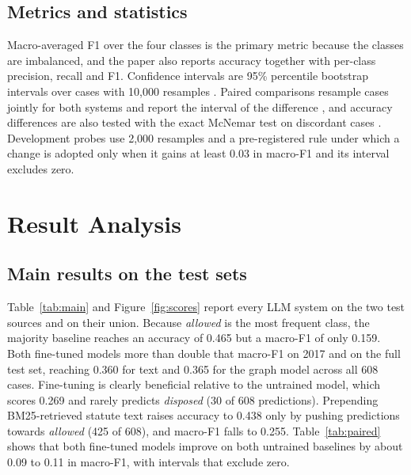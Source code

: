 \documentclass[journal]{IEEEtran}
\newcommand{\cls}[1]{\emph{#1}}
\begin{document}
\subsection{Metrics and statistics}
Macro-averaged F1 over the four classes is the primary metric because the classes are imbalanced, and the paper also reports accuracy together with per-class precision, recall and F1. Confidence intervals are 95\% percentile bootstrap intervals over cases with 10,000 resamples \cite{r34}. Paired comparisons resample cases jointly for both systems and report the interval of the difference \cite{r28}, and accuracy differences are also tested with the exact McNemar test on discordant cases \cite{r35}. Development probes use 2,000 resamples and a pre-registered rule under which a change is adopted only when it gains at least 0.03 in macro-F1 and its interval excludes zero.

\section{Result Analysis}\label{sec:results}
\subsection{Main results on the test sets}
Table~\ref{tab:main} and Figure~\ref{fig:scores} report every LLM system on the two test sources and on their union. Because \cls{allowed} is the most frequent class, the majority baseline reaches an accuracy of 0.465 but a macro-F1 of only 0.159. Both fine-tuned models more than double that macro-F1 on 2017 and on the full test set, reaching 0.360 for text and 0.365 for the graph model across all 608 cases. Fine-tuning is clearly beneficial relative to the untrained model, which scores 0.269 and rarely predicts \cls{disposed} (30 of 608 predictions). Prepending BM25-retrieved statute text raises accuracy to 0.438 only by pushing predictions towards \cls{allowed} (425 of 608), and macro-F1 falls to 0.255. Table~\ref{tab:paired} shows that both fine-tuned models improve on both untrained baselines by about 0.09 to 0.11 in macro-F1, with intervals that exclude zero.
\end{document}
